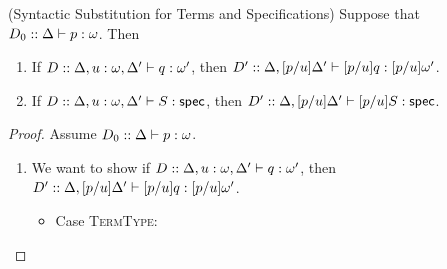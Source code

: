 \begin{lemma}{(Syntactic Substitution for Terms and Specifications)}
Suppose that $D_0 :: \judgeA{p}{\omega}$. Then
\begin{enumerate}
\item If $D :: \judgeA[{\Delta, u:\omega, \Delta'}]{q}{\omega'}$, then 
         $D' :: \judgeA[{\Delta, [p/u]\Delta'}]{[p/u]q}{[p/u]\omega'}$. 
\item If $D :: \judgeS[{\Delta, u:\omega, \Delta'}]{S}$, then 
         $D' :: \judgeS[{\Delta, [p/u]\Delta'}]{[p/u]S}$. 
\end{enumerate}
\end{lemma}
\begin{proof}
  Assume $D_0 :: \judgeA{p}{\omega}$.
  \begin{enumerate}
  \item We want to show if $D :: \judgeA[{\Delta, u:\omega, \Delta'}]{q}{\omega'}$, then 
         $D' :: \judgeA[{\Delta, [p/u]\Delta'}]{[p/u]q}{[p/u]\omega'}$.
    \begin{itemize}
    \item Case \textsc{TermType}: 
\end{itemize}
\end{enumerate}
\end{proof}
